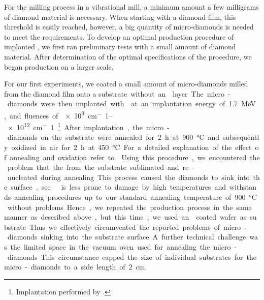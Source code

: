 			For the milling process in a vibrational mill, a minimum amount a few milligrams of diamond material is necessary.
		When starting with a diamond film, this threshold is easily reached, however, a big quantity of micro-diamonds is needed to meet the requirements.
		To develop an optimal production procedure of implanted \nds, we first ran preliminary tests with a small amount of diamond material.
		After determination of the optimal specifications of the procedure, we began production on a larger scale.
	
			For our first experiments, we coated a small amount of micro-diamonds milled from the diamond film onto a \si substrate without an \ir layer.
		The micro-diamonds were then implanted with  at an implantation energy of \SI{1.7}{MeV}, and fluences of \SIrange{e9}{e12}{cm^-1}\footnote{Implantation performed by \rogalla.}.
		After implantation, the micro-diamonds on the \si substrate were annealed for \SI{2}{\hour} at \SI{900}{\celsius} and subsequently oxidized in air for \SI{2}{\hour} at \SI{450}{\celsius}. For a detailed explanation of the effect of annealing and oxidation refer to .
		Using this procedure, we encountered the problem that the \si from the substrate sublimated and re-nucleated during annealing.
		This process caused the diamonds to sink into the \si surface, see .
	
			\Ir is less prone to damage by high temperatures and withstands annealing procedures up to our standard annealing temperature of \SI{900}{\celsius} without problems.
		Hence, we repeated the production process in the same manner as described above, but this time, we used an \ir coated \si wafer as substrate.
		Thus we effectively circumvented the reported problems of micro-diamonds sinking into the substrate surface.
	
			A further technical challenge was the limited space in the vacuum oven used for annealing the micro-diamonds.
		This circumstance capped the size of individual substrates for the micro-diamonds to a side length of \SI{2}{cm}.

